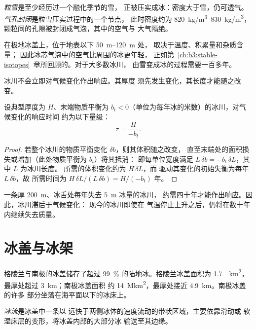 \begin{definition}[粒雪；气孔封闭]\label{def:b3:glaciology:firn}
\emph{粒雪}是至少经历过一个融化季节的雪，
正被压实成冰：密度大于雪，仍可透气。
\emph{气孔封闭}是粒雪压实过程中的一个节点，
此时密度约为 \qtyrange{820}{830}{kg/m^3}，
颗粒间的孔隙被封闭成气泡，其中的空气与
大气隔绝。
\end{definition}

在极地冰盖上，位于地表以下 \qtyrange{50}{120}{m} 处，
取决于温度、积累量和杂质含量；
因此冰芯气泡中的空气比周围的冰更年轻，
正如第~\ref{ch:b3:stable-isotopes}~章所回顾的。对于大多数冰川，
由雪变成冰的过程需要一百多年。

冰川不会立即对气候变化作出响应。其厚度
须先发生变化，其长度才能随之改变。

\begin{proposition}[冰川响应时间]\label{prop:b3:glaciology:response}
设典型厚度为 $H$、末端物质平衡为 $b_t <
0$（单位为每年冰的米数）的冰川，对气候变化的响应时间
约为以下量级：
\[
\tau = \frac{H}{-b_t} .
\]
\end{proposition}

\begin{proof}
若整个冰川的物质平衡变化 $\delta b$，则其体积随之改变，
直至末端处的面积损失或增加（此处物质平衡为 $b_t$）将其抵消：
即每单位宽度满足 $L\,\delta b = -b_t\,\delta L$，其中 $L$ 为冰川长度。
所需的体积变化约为 $H\,\delta L$，而
驱动其变化的初始失衡为每年 $L\,\delta b$，故
所需时间为 $H\,\delta L/(L\,\delta b) = H/(-b_t)$ 年。
\end{proof}

一条厚 \qty{200}{m}、冰舌处每年失去 \qty{5}{m} 冰量的冰川，
约需四十年才能作出响应。因此，冰川滞后于气候变化：
现今的冰川即使在
气温停止上升之后，仍将在数十年内继续失去质量。

\section{冰盖与冰架}\label{sec:b3:glaciology:ice-sheets}

格陵兰与南极的冰盖储存了超过
\qty{99}{\percent} 的陆地冰。格陵兰冰盖面积为 \qty{1.7}{\mega
km^2}，最厚处超过 \qty{3}{km}；南极冰盖面积
约 \qty{14}{\mega km^2}，最厚处接近 \qty{4.9}{km}。南极冰盖的许多
部分坐落在海平面以下的冰床上。

\begin{definition}[冰流]\label{def:b3:glaciology:ice-stream}
\emph{冰流}是冰盖中一条以
远快于两侧冰体的速度流动的带状区域，主要依靠滑动或
软湿床层的变形，将冰盖内部的大部分冰
输送至其边缘。
\end{definition}

